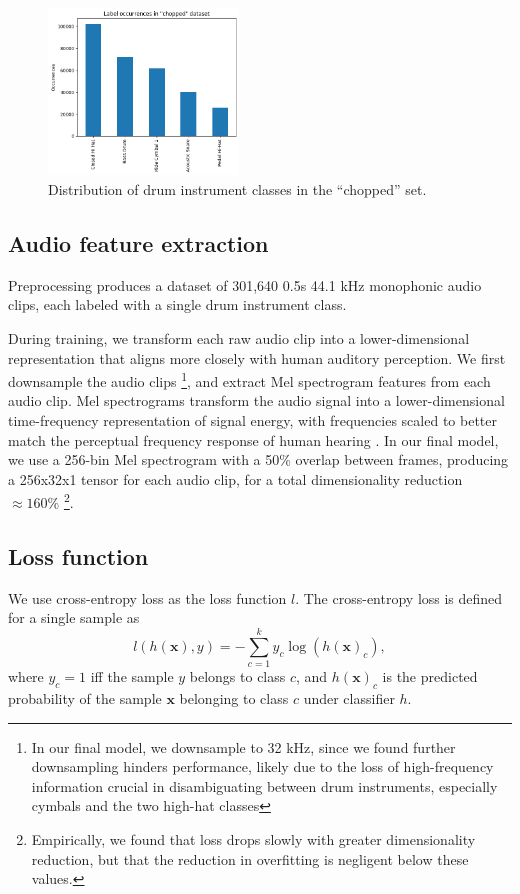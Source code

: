 \documentclass[twocolumn]{article}
\begin{document}
\begin{figure}
\centering
\includegraphics[width=0.45\textwidth]{figures/chopped_dataset_label_occurrences.png}
\caption{Distribution of drum instrument classes in the ``chopped'' set.}
\label{fig:class_occurrences}
\end{figure}

\subsection{Audio feature extraction}

Preprocessing produces a dataset of 301,640 0.5s 44.1 kHz monophonic audio clips, each labeled with a single drum instrument class.

During training, we transform each raw audio clip into a lower-dimensional representation that aligns more closely with human auditory perception.
We first downsample the audio clips \footnote{In our final model, we downsample to 32 kHz, since we found further downsampling hinders performance, likely due to the loss of high-frequency information crucial in disambiguating between drum instruments, especially cymbals and the two high-hat classes},
and extract Mel spectrogram features from each audio clip.
Mel spectrograms transform the audio signal into a lower-dimensional time-frequency representation of signal energy, with frequencies scaled to better match the perceptual frequency response of human hearing \cite{hershey_cnn_2017}.
In our final model, we use a 256-bin Mel spectrogram with a 50\% overlap between frames, producing a 256x32x1 tensor for each audio clip, for a total dimensionality reduction $\approx 160\%$ \footnote{Empirically, we found that loss drops slowly with greater dimensionality reduction, but that the reduction in overfitting is negligent below these values.}.

\subsection{Loss function}
We use cross-entropy loss as the loss function $l$.
The cross-entropy loss is defined for a single sample as
\[l(h(\mathbf{x}), y) = -\sum_{c=1}^k y_c \log(h(\mathbf{x})_c),\]
where $y_c = 1$ iff the sample $y$ belongs to class $c$, and $h(\mathbf{x})_c$ is the predicted probability of the sample $\mathbf{x}$ belonging to class $c$ under classifier \( h \).
\end{document}
